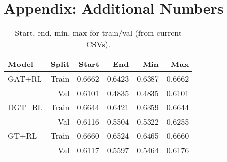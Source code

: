 \documentclass[11pt,a4paper]{article}
\begin{document}
\section*{Appendix: Additional Numbers}
\begin{table}[h]
  \centering
  \caption{Start, end, min, max for train/val (from current CSVs).}
  \label{tab:extra}
  \begin{tabular}{lrrrrr}
    \toprule
    Model & Split & Start & End & Min & Max \\
    \midrule
    GAT+RL & Train & 0.6662 & 0.6423 & 0.6387 & 0.6662 \\
           & Val   & 0.6101 & 0.4835 & 0.4835 & 0.6101 \\
    DGT+RL & Train & 0.6644 & 0.6421 & 0.6359 & 0.6644 \\
           & Val   & 0.6116 & 0.5504 & 0.5322 & 0.6255 \\
    GT+RL  & Train & 0.6660 & 0.6524 & 0.6465 & 0.6660 \\
           & Val   & 0.6117 & 0.5597 & 0.5464 & 0.6176 \\
    \bottomrule
  \end{tabular}
\end{table}
\end{document}

